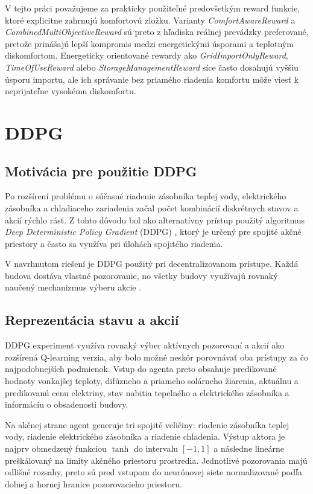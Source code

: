 \documentclass[conference]{IEEEtran}
\begin{document}
V tejto práci považujeme za prakticky použiteľné predovšetkým reward funkcie, ktoré explicitne zahrnujú komfortovú zložku. Varianty \textit{ComfortAwareReward} a \textit{CombinedMultiObjectiveReward} sú preto z hľadiska reálnej prevádzky preferované, pretože prinášajú lepší kompromis medzi energetickými úsporami a teplotným diskomfortom. Energeticky orientované rewardy ako \textit{GridImportOnlyReward}, \textit{TimeOfUseReward} alebo \textit{StorageManagementReward} síce často dosahujú vyššiu úsporu importu, ale ich správanie bez priamého riadenia komfortu môže viesť k neprijateľne vysokému diskomfortu.

\section{DDPG}

\subsection{Motivácia pre použitie DDPG}

Po rozšírení problému o súčasné riadenie zásobníka teplej vody, elektrického zásobníka a chladiaceho zariadenia začal počet kombinácií diskrétnych stavov a akcií rýchlo rásť. Z tohto dôvodu bol ako alternatívny prístup použitý algoritmus \textit{Deep Deterministic Policy Gradient} (DDPG) \cite{b14}, ktorý je určený pre spojité akčné priestory a často sa využíva pri úlohách spojitého riadenia.

V navrhnutom riešení je DDPG použitý pri decentralizovanom prístupe. Každá budova dostáva vlastné pozorovanie, no všetky budovy využívajú rovnaký naučený mechanizmus výberu akcie \cite{b21,b22}.

\subsection{Reprezentácia stavu a akcií}

DDPG experiment využíva rovnaký výber aktívnych pozorovaní a akcií ako rozšírená Q-learning verzia, aby bolo možné neskôr porovnávať oba prístupy za čo najpodobnejších podmienok. Vstup do agenta preto obsahuje predikované hodnoty vonkajšej teploty, difúzneho a priameho solárneho žiarenia, aktuálnu a predikovanú cenu elektriny, stav nabitia tepelného a elektrického zásobníka a informáciu o obsadenosti budovy.

Na akčnej strane agent generuje tri spojité veličiny: riadenie zásobníka teplej vody, riadenie elektrického zásobníka a riadenie chladenia. Výstup aktora je najprv obmedzený funkciou $\tanh$ do intervalu $[-1,1]$ a následne lineárne preškálovaný na limity akčného priestoru prostredia. Jednotlivé pozorovania majú odlišné rozsahy, preto sú pred vstupom do neurónovej siete normalizované podľa dolnej a hornej hranice pozorovacieho priestoru.
\end{document}
